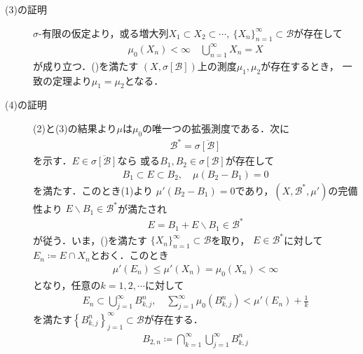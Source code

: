 \begin{prf}
\begin{description}
				\item[(3)の証明]
					$\sigma$-有限の仮定より，或る増大列$X_1 \subset X_2 \subset \cdots
					,\ \{X_n\}_{n=1}^\infty \subset \mathcal{B}$が存在して
					\begin{align}
						\mu_0 (X_n) < \infty \quad \bigcup_{n=1}^\infty X_n = X
						\label{eq:appendix_finite_additive_measure_expansion_3}
					\end{align}
					が成り立つ．()を満たす
					$\left( X,\sigma[\mathcal{B}] \right)$上の測度$\mu_1,\mu_2$が存在するとき，
					一致の定理より$\mu_1 = \mu_2$となる．
					
				\item[(4)の証明]
					(2)と(3)の結果より$\mu$は$\mu_0$の唯一つの拡張測度である．次に
					\begin{align}
						\mathcal{B}^* = \overline{\sigma[\mathcal{B}]}
						\label{eq:appendix_finite_additive_measure_expansion_4}
					\end{align}
					を示す．$E \in \overline{\sigma[\mathcal{B}]}$なら
					或る$B_1,B_2 \in \sigma[\mathcal{B}]$が存在して
					\begin{align}
						B_1 \subset E \subset B_2, \quad \mu(B_2 - B_1) = 0
					\end{align}
					を満たす．このとき(1)より
					$\mu'(B_2 - B_1) = 0$であり，$\left( X,\mathcal{B}^*,\mu' \right)$の完備性より
					$E \backslash B_1 \in \mathcal{B}^*$が満たされ
					\begin{align}
						E = B_1 + E \backslash B_1 \in \mathcal{B}^*
					\end{align}
					が従う．いま，()を満たす
					$\{X_n\}_{n=1}^\infty \subset \mathcal{B}$を取り，
					$E \in \mathcal{B}^*$に対して$E_n \coloneqq E \cap X_n$とおく．このとき
					\begin{align}
						\mu'(E_n) \leq \mu'(X_n) = \mu_0(X_n) < \infty
					\end{align}
					となり，任意の$k = 1,2,\cdots$に対して
					\begin{align}
						E_n \subset \bigcup_{j=1}^\infty B^n_{k,j},
						\quad
						\sum_{j=1}^\infty \mu_0\left( B^n_{k,j} \right)
						< \mu'(E_n) + \frac{1}{k}
					\end{align}
					を満たす$\left\{B^n_{k,j}\right\}_{j=1}^\infty \subset \mathcal{B}$が存在する．
					\begin{align}
						B_{2,n} \coloneqq \bigcap_{k=1}^\infty \bigcup_{j=1}^\infty B^n_{k,j}
					\end{align}

\end{description}
\end{prf}

